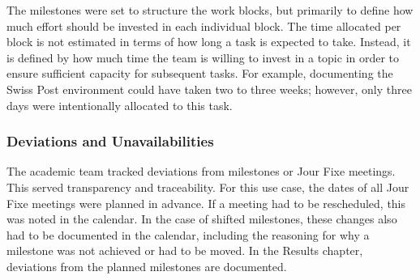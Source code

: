The milestones were set to structure the work blocks, but primarily to define how much effort should be invested in each individual block. The time allocated per block is not estimated in terms of how long a task is expected to take. Instead, it is defined by how much time the team is willing to invest in a topic in order to ensure sufficient capacity for subsequent tasks. For example, documenting the Swiss Post environment could have taken two to three weeks; however, only three days were intentionally allocated to this task.

\subsubsection*{Deviations and Unavailabilities}
The academic team tracked deviations from milestones or Jour Fixe meetings. This served transparency and traceability. For this use case, the dates of all Jour Fixe meetings were planned in advance. If a meeting had to be rescheduled, this was noted in the calendar. In the case of shifted milestones, these changes also had to be documented in the calendar, including the reasoning for why a milestone was not achieved or had to be moved. In the Results chapter, deviations from the planned milestones are documented.
